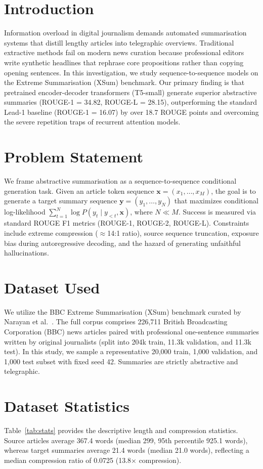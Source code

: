 \documentclass[conference]{IEEEtran}
\begin{document}
\section{Introduction}
Information overload in digital journalism demands automated summarisation systems that distill lengthy articles into telegraphic overviews. Traditional extractive methods fail on modern news curation because professional editors write synthetic headlines that rephrase core propositions rather than copying opening sentences. In this investigation, we study sequence-to-sequence models on the Extreme Summarisation (XSum) benchmark. Our primary finding is that pretrained encoder-decoder transformers (T5-small) generate superior abstractive summaries (ROUGE-1 = 34.82, ROUGE-L = 28.15), outperforming the standard Lead-1 baseline (ROUGE-1 = 16.07) by over 18.7 ROUGE points and overcoming the severe repetition traps of recurrent attention models.

\section{Problem Statement}
We frame abstractive summarisation as a sequence-to-sequence conditional generation task. Given an article token sequence $\mathbf{x} = (x_1, \dots, x_M)$, the goal is to generate a target summary sequence $\mathbf{y} = (y_1, \dots, y_N)$ that maximizes conditional log-likelihood $\sum_{t=1}^N \log P(y_t \mid y_{<t}, \mathbf{x})$, where $N \ll M$. Success is measured via standard ROUGE F1 metrics (ROUGE-1, ROUGE-2, ROUGE-L). Constraints include extreme compression ($\approx$14:1 ratio), source sequence truncation, exposure bias during autoregressive decoding, and the hazard of generating unfaithful hallucinations.

\section{Dataset Used}
We utilize the BBC Extreme Summarisation (XSum) benchmark curated by Narayan et al.~\cite{narayan2018}. The full corpus comprises 226,711 British Broadcasting Corporation (BBC) news articles paired with professional one-sentence summaries written by original journalists (split into 204k train, 11.3k validation, and 11.3k test). In this study, we sample a representative 20,000 train, 1,000 validation, and 1,000 test subset with fixed seed 42. Summaries are strictly abstractive and telegraphic.

\section{Dataset Statistics}
Table~\ref{tab:stats} provides the descriptive length and compression statistics. Source articles average 367.4 words (median 299, 95th percentile 925.1 words), whereas target summaries average 21.4 words (median 21.0 words), reflecting a median compression ratio of 0.0725 (13.8$\times$ compression).
\end{document}
